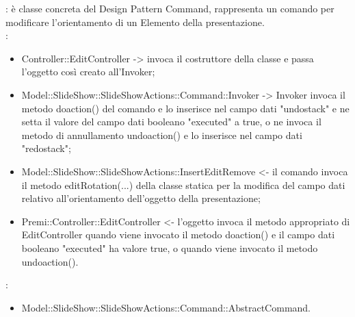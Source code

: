 {{	\textbf{\tipo}: è classe concreta del Design Pattern Command, rappresenta un comando per modificare l'orientamento di un Elemento della presentazione.\\	
	\textbf{\relaz}: 
	\begin{itemize}
		\item Controller::\-EditController -> invoca il costruttore della classe e passa l’oggetto così creato all’Invoker;
		\item Model::\-SlideShow::\-SlideShowActions::\-Command::\-Invoker -> Invoker invoca il metodo doaction() del comando e lo inserisce nel campo dati "undostack" e ne setta il valore del campo dati booleano "executed" a true, o ne invoca il metodo di annullamento undoaction() e lo inserisce nel campo dati "redostack";
		\item Model::\-SlideShow::\-SlideShowActions::\-InsertEditRemove <- il comando invoca il metodo editRotation(...) della classe statica per la modifica del campo dati relativo all'orientamento dell'oggetto della presentazione;
		\item Premi::\-Controller::\-EditController <- l'oggetto invoca il metodo appropriato di EditController quando viene invocato il metodo doaction() e il campo dati booleano "executed" ha valore true, o quando viene invocato il metodo undoaction().
	\end{itemize}	
	\textbf{\base}: 
		\begin{itemize}
		\item Model::\-SlideShow::\-SlideShowActions::\-Command::\-AbstractCommand.
		\end{itemize}
		}
		}
